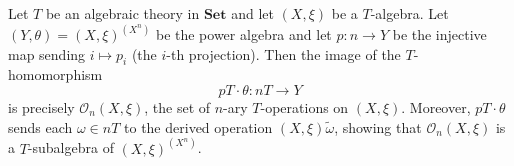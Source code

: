 Let $T$ be an algebraic theory in $\mathbf{Set}$ and let $(X, \xi)$ be a $T$-algebra.
Let $(Y, \theta) = (X, \xi)^{(X^n)}$ be the power algebra and let
$p \colon n \to Y$ be the injective map sending $i \mapsto p_i$ (the $i$-th projection).
Then the image of the $T$-homomorphism
$$pT \cdot \theta \colon nT \longrightarrow Y$$
is precisely $\mathcal{O}_n(X, \xi)$, the set of $n$-ary $T$-operations on $(X, \xi)$.
Moreover, $pT \cdot \theta$ sends each $\omega \in nT$ to the derived operation
$(X, \xi)\tilde{\omega}$, showing that $\mathcal{O}_n(X, \xi)$ is a $T$-subalgebra of $(X, \xi)^{(X^n)}$.
